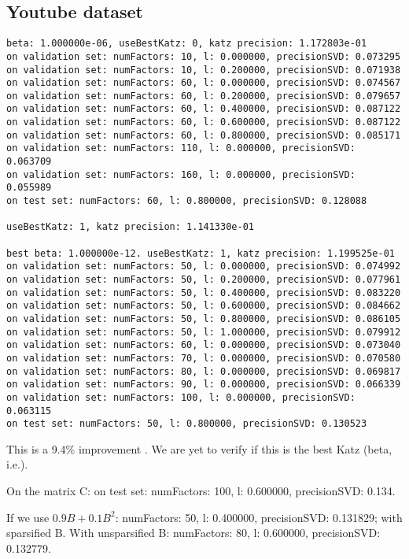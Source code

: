\documentclass{report}
\begin{document}
\subsection{Youtube dataset}
\begin{verbatim}
beta: 1.000000e-06, useBestKatz: 0, katz precision: 1.172803e-01
on validation set: numFactors: 10, l: 0.000000, precisionSVD: 0.073295
on validation set: numFactors: 10, l: 0.200000, precisionSVD: 0.071938
on validation set: numFactors: 60, l: 0.000000, precisionSVD: 0.074567
on validation set: numFactors: 60, l: 0.200000, precisionSVD: 0.079657
on validation set: numFactors: 60, l: 0.400000, precisionSVD: 0.087122
on validation set: numFactors: 60, l: 0.600000, precisionSVD: 0.087122
on validation set: numFactors: 60, l: 0.800000, precisionSVD: 0.085171
on validation set: numFactors: 110, l: 0.000000, precisionSVD: 0.063709
on validation set: numFactors: 160, l: 0.000000, precisionSVD: 0.055989
on test set: numFactors: 60, l: 0.800000, precisionSVD: 0.128088

useBestKatz: 1, katz precision: 1.141330e-01

best beta: 1.000000e-12. useBestKatz: 1, katz precision: 1.199525e-01
on validation set: numFactors: 50, l: 0.000000, precisionSVD: 0.074992
on validation set: numFactors: 50, l: 0.200000, precisionSVD: 0.077961
on validation set: numFactors: 50, l: 0.400000, precisionSVD: 0.083220
on validation set: numFactors: 50, l: 0.600000, precisionSVD: 0.084662
on validation set: numFactors: 50, l: 0.800000, precisionSVD: 0.086105
on validation set: numFactors: 50, l: 1.000000, precisionSVD: 0.079912
on validation set: numFactors: 60, l: 0.000000, precisionSVD: 0.073040
on validation set: numFactors: 70, l: 0.000000, precisionSVD: 0.070580
on validation set: numFactors: 80, l: 0.000000, precisionSVD: 0.069817
on validation set: numFactors: 90, l: 0.000000, precisionSVD: 0.066339
on validation set: numFactors: 100, l: 0.000000, precisionSVD: 0.063115
on test set: numFactors: 50, l: 0.800000, precisionSVD: 0.130523
\end{verbatim}
This is a 9.4\% improvement \tbc. We are yet to verify if this is the best Katz (beta, i.e.).

On the matrix C: on test set: numFactors: 100, l: 0.600000, precisionSVD: 0.134.

If we use $0.9 B + 0.1 B^{2}$: numFactors: 50, l: 0.400000, precisionSVD: 0.131829; with sparsified B. With unsparsified B: numFactors: 80, l: 0.600000, precisionSVD: 0.132779.
\end{document}
